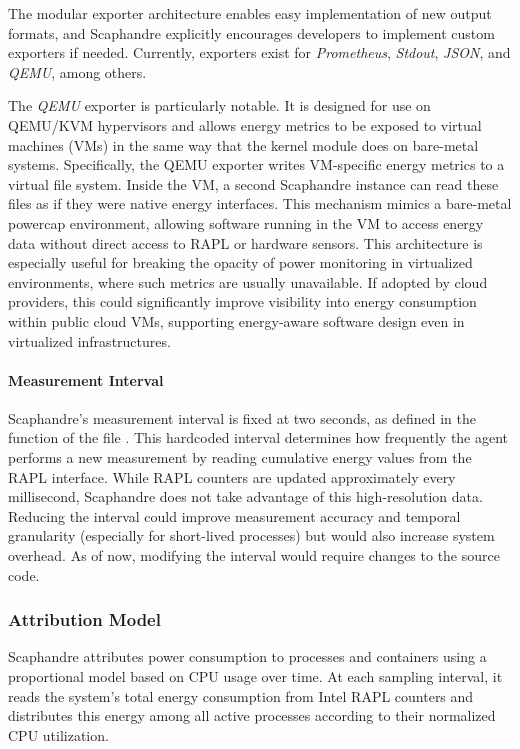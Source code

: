 The modular exporter architecture enables easy implementation of new output formats, and Scaphandre explicitly encourages developers to implement custom exporters if needed. Currently, exporters exist for \textit{Prometheus}, \textit{Stdout}, \textit{JSON}, and \textit{QEMU}, among others.

The \textit{QEMU} exporter is particularly notable. It is designed for use on QEMU/KVM hypervisors and allows energy metrics to be exposed to virtual machines (VMs) in the same way that the  kernel module does on bare-metal systems. Specifically, the QEMU exporter writes VM-specific energy metrics to a virtual file system. Inside the VM, a second Scaphandre instance can read these files as if they were native energy interfaces. This mechanism mimics a bare-metal powercap environment, allowing software running in the VM to access energy data without direct access to RAPL or hardware sensors. This architecture is especially useful for breaking the opacity of power monitoring in virtualized environments, where such metrics are usually unavailable. If adopted by cloud providers, this could significantly improve visibility into energy consumption within public cloud VMs, supporting energy-aware software design even in virtualized infrastructures.

\paragraph{Measurement Interval}
Scaphandre's measurement interval is fixed at two seconds, as defined in the  function of the file . This hardcoded interval determines how frequently the agent performs a new measurement by reading cumulative energy values from the RAPL interface. While RAPL counters are updated approximately every millisecond, Scaphandre does not take advantage of this high-resolution data. Reducing the interval could improve measurement accuracy and temporal granularity (especially for short-lived processes) but would also increase system overhead. As of now, modifying the interval would require changes to the source code.

\subsubsection{Attribution Model}
\label{sec:scaphandre-attribution}

Scaphandre attributes power consumption to processes and containers using a proportional model based on CPU usage over time. At each sampling interval, it reads the system's total energy consumption from Intel RAPL counters and distributes this energy among all active processes according to their normalized CPU utilization.

